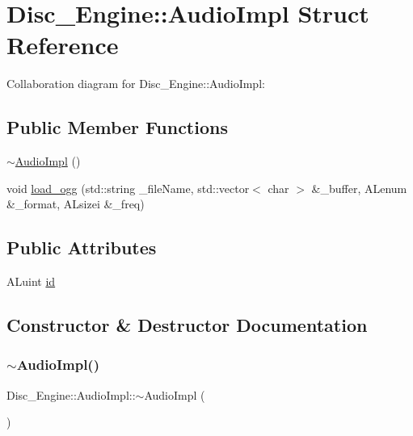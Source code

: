 \hypertarget{struct_disc___engine_1_1_audio_impl}{}\section{Disc\+\_\+\+Engine\+:\+:Audio\+Impl Struct Reference}
\label{struct_disc___engine_1_1_audio_impl}


Collaboration diagram for Disc\+\_\+\+Engine\+:\+:Audio\+Impl\+:
\subsection*{Public Member Functions}
\begin{DoxyCompactItemize}
\item 
\mbox{\hyperlink{struct_disc___engine_1_1_audio_impl_a6cfc7796e832d3d08040d60de40fe48e}{$\sim$\+Audio\+Impl}} ()
\item 
void \mbox{\hyperlink{struct_disc___engine_1_1_audio_impl_a94e1969559357e6e645b29b81a566fb5}{load\+\_\+ogg}} (std\+::string \+\_\+file\+Name, std\+::vector$<$ char $>$ \&\+\_\+buffer, A\+Lenum \&\+\_\+format, A\+Lsizei \&\+\_\+freq)
\end{DoxyCompactItemize}
\subsection*{Public Attributes}
\begin{DoxyCompactItemize}
\item 
A\+Luint \mbox{\hyperlink{struct_disc___engine_1_1_audio_impl_a4cfe498978d1b27d012f198829744fbb}{id}}
\end{DoxyCompactItemize}


\subsection{Constructor \& Destructor Documentation}
\mbox{\label{struct_disc___engine_1_1_audio_impl_a6cfc7796e832d3d08040d60de40fe48e}} 
\subsubsection{\texorpdfstring{$\sim$\+Audio\+Impl()}{~AudioImpl()}}
{\footnotesize\ttfamily Disc\+\_\+\+Engine\+::\+Audio\+Impl\+::$\sim$\+Audio\+Impl (\begin{DoxyParamCaption}{ }\end{DoxyParamCaption})\hspace{0.3cm}{\ttfamily [inline]}}



